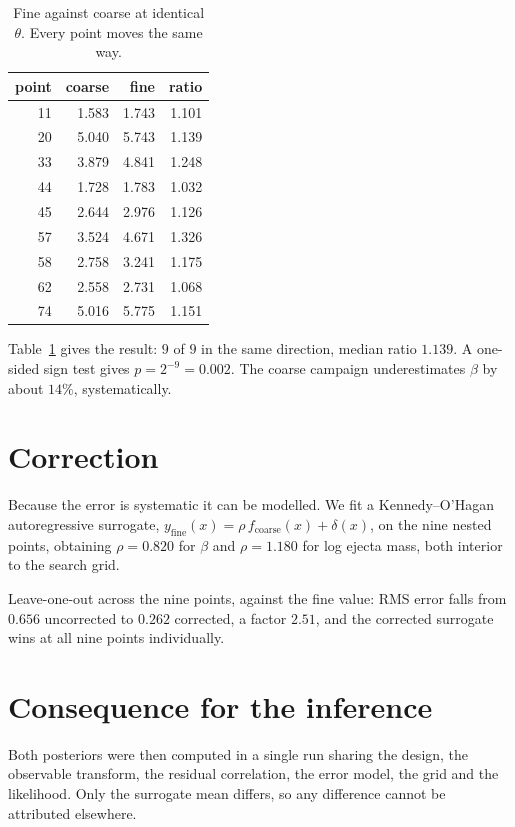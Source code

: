 \documentclass[10pt,twocolumn]{article}
\begin{document}
\begin{table}[t]
\centering\small
\caption{Fine against coarse at identical $\theta$. Every point moves
the same way.}
\label{tab:bias}
\begin{tabular}{rrrr}
\toprule
point & coarse & fine & ratio \\
\midrule
11 & 1.583 & 1.743 & 1.101 \\
20 & 5.040 & 5.743 & 1.139 \\
33 & 3.879 & 4.841 & 1.248 \\
44 & 1.728 & 1.783 & 1.032 \\
45 & 2.644 & 2.976 & 1.126 \\
57 & 3.524 & 4.671 & 1.326 \\
58 & 2.758 & 3.241 & 1.175 \\
62 & 2.558 & 2.731 & 1.068 \\
74 & 5.016 & 5.775 & 1.151 \\
\bottomrule
\end{tabular}
\end{table}

Table~\ref{tab:bias} gives the result: $9$ of $9$ in the same
direction, median ratio $1.139$. A one-sided sign test gives
$p = 2^{-9} = 0.002$. The coarse campaign underestimates $\beta$ by
about $14\%$, systematically.

\section{Correction}

Because the error is systematic it can be modelled. We fit a
Kennedy--O'Hagan autoregressive surrogate,
$y_{\text{fine}}(x) = \rho\, f_{\text{coarse}}(x) + \delta(x)$,
on the nine nested points, obtaining $\rho = 0.820$ for $\beta$ and
$\rho = 1.180$ for log ejecta mass, both interior to the search grid.

Leave-one-out across the nine points, against the fine value: RMS
error falls from $0.656$ uncorrected to $0.262$ corrected, a factor
$2.51$, and the corrected surrogate wins at all nine points
individually.

\section{Consequence for the inference}

Both posteriors were then computed in a single run sharing the design,
the observable transform, the residual correlation, the error model,
the grid and the likelihood. Only the surrogate mean differs, so any
difference cannot be attributed elsewhere.
\end{document}

